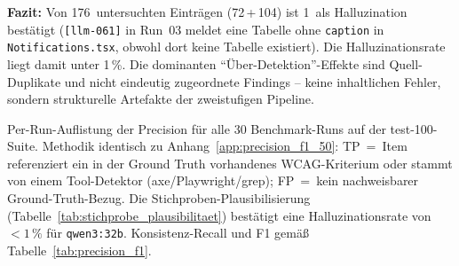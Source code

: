 \noindent\textbf{Fazit:} Von 176~untersuchten Einträgen (72\,+\,104) ist 1~als Halluzination bestätigt (\texttt{[llm-061]} in Run~03 meldet eine Tabelle ohne \texttt{caption} in \texttt{Notifications.tsx}, obwohl dort keine Tabelle existiert). Die Halluzinationsrate liegt damit unter 1\,\%. Die dominanten ``Über-Detektion''-Effekte sind Quell-Duplikate und nicht eindeutig zugeordnete Findings -- keine inhaltlichen Fehler, sondern strukturelle Artefakte der zweistufigen Pipeline.

\clearpage

\label{app:precision_f1_100}

\noindent Per-Run-Auflistung der Precision für alle 30 Benchmark-Runs auf der test-100-Suite. Methodik identisch zu Anhang~\ref{app:precision_f1_50}: \ac{TP}~=~Item referenziert ein in der Ground Truth vorhandenes \ac{WCAG}-Kriterium oder stammt von einem Tool-Detektor (axe/Playwright/grep); \ac{FP}~=~kein nachweisbarer Ground-Truth-Bezug. Die Stichproben-Plausibilisierung (Tabelle~\ref{tab:stichprobe_plausibilitaet}) bestätigt eine Halluzinationsrate von $<1\,\%$ für \texttt{qwen3:32b}. Konsistenz-Recall und F1 gemäß Tabelle~\ref{tab:precision_f1}.


